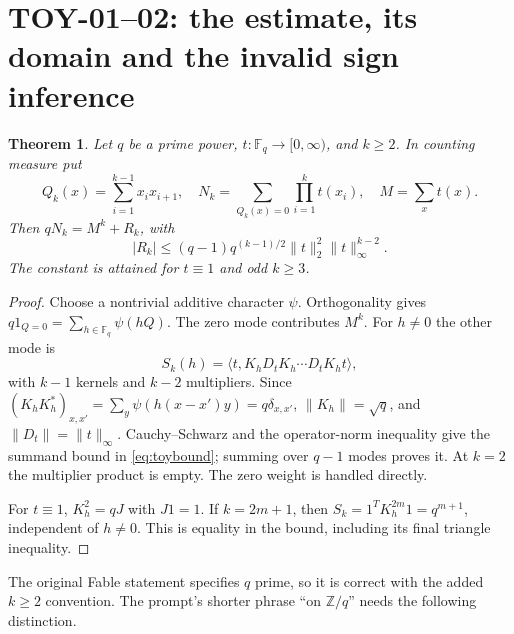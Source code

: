 \documentclass[11pt,a4paper]{article}
\newcommand{\Z}{\mathbb Z}
\newcommand{\F}{\mathbb F}
\newtheorem*{theorem}{Theorem}
\begin{document}
\section{TOY-01--02: the estimate, its domain and the invalid sign inference}
\begin{theorem}
Let $q$ be a prime power, $t:\F_q\to[0,\infty)$, and $k\ge2$. In counting measure put
\[
 Q_k(x)=\sum_{i=1}^{k-1}x_ix_{i+1},\quad
 N_k=\sum_{Q_k(x)=0}\prod_{i=1}^kt(x_i),\quad M=\sum_x t(x).
\]
Then $qN_k=M^k+R_k$, with
\begin{equation}\label{eq:toybound}
 |R_k|\le(q-1)q^{(k-1)/2}\|t\|_2^2\|t\|_\infty^{k-2}.
\end{equation}
The constant is attained for $t\equiv1$ and odd $k\ge3$.
\end{theorem}
\begin{proof}
Choose a nontrivial additive character $\psi$. Orthogonality gives
$q1_{Q=0}=\sum_{h\in\F_q}\psi(hQ)$. The zero mode contributes $M^k$. For $h\ne0$ the other mode is
\[
 S_k(h)=\langle t,K_hD_tK_h\cdots D_tK_ht\rangle,
\]
with $k-1$ kernels and $k-2$ multipliers. Since
$(K_hK_h^*)_{x,x'}=\sum_y\psi(h(x-x')y)=q\delta_{x,x'}$,
$\|K_h\|=\sqrt q$, and $\|D_t\|=\|t\|_\infty$. Cauchy--Schwarz and the operator-norm inequality give the summand bound in \eqref{eq:toybound}; summing over $q-1$ modes proves it. At $k=2$ the multiplier product is empty. The zero weight is handled directly.

For $t\equiv1$, $K_h^2=qJ$ with $J1=1$. If $k=2m+1$, then $S_k=1^TK_h^{2m}1=q^{m+1}$, independent of $h\ne0$. This is equality in the bound, including its final triangle inequality.
\end{proof}
The original Fable statement specifies $q$ prime, so it is correct with the added $k\ge2$ convention. The prompt's shorter phrase ``on $\Z/q$'' needs the following distinction.
\end{document}
